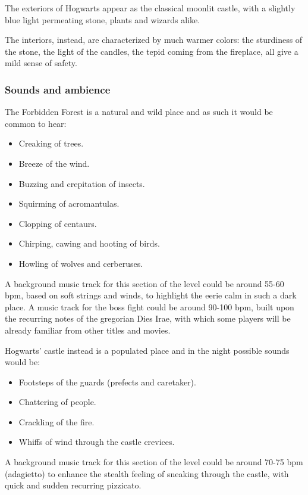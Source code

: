 The exteriors of Hogwarts appear as the classical moonlit castle, with a slightly blue light permeating stone, plants and wizards alike.

\clearpage
The interiors, instead, are characterized by much warmer colors: the sturdiness of the stone, the light of the candles, the tepid coming from the fireplace, all give a mild sense of safety.

\clearpage

\subsubsection{Sounds and ambience}

The Forbidden Forest is a natural and wild place and as such it would be common to hear:
\begin{itemize}
	\item Creaking of trees.
	\item Breeze of the wind.
	\item Buzzing and crepitation of insects.
	\item Squirming of acromantulas.
	\item Clopping of centaurs.
	\item Chirping, cawing and hooting of birds.
	\item Howling of wolves and cerberuses.
\end{itemize}

A background music track for this section of the level could be around 55-60 bpm, based on soft strings and winds, to highlight the eerie calm in such a dark place.
A music track for the boss fight could be around 90-100 bpm, built upon the recurring notes of the gregorian Dies Irae, with which some players will be already familiar from other titles and movies.

Hogwarts' castle instead is a populated place and in the night possible sounds would be:
\begin{itemize}
	\item Footsteps of the guards (prefects and caretaker).
	\item Chattering of people.
	\item Crackling of the fire.
	\item Whiffs of wind through the castle crevices.
\end{itemize}
A background music track for this section of the level could be around 70-75 bpm (adagietto) to enhance the stealth feeling of sneaking through the castle, with quick and sudden recurring pizzicato.

\clearpage